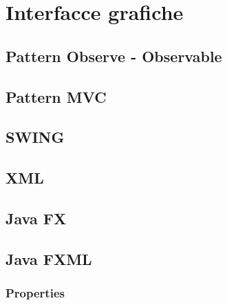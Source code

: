 \chapter{Interfacce grafiche}

\section{Pattern Observe - Observable}

\section{Pattern MVC}

\section{SWING}

\section{XML}

\section{Java FX}

\section{Java FXML}

\subsection{Properties}

